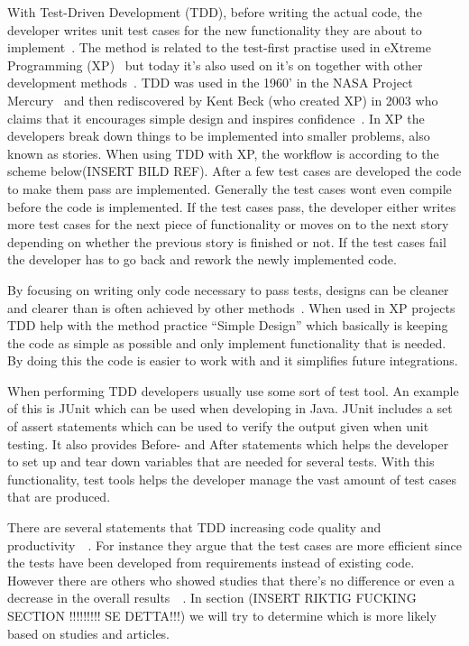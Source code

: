 With Test-Driven Development (TDD), before writing the actual code, the developer writes unit test cases for the new functionality they are about to implement~\cite{beckTestDriven}. The method is related to the test-first practise used in eXtreme Programming (XP)~\cite{beckXP} but today it’s also used on it’s on together with other development methods~\cite{MSNET}. TDD was used in the 1960’ in the NASA Project Mercury~\cite{NASA} and then rediscovered by Kent Beck (who created XP) in 2003 who claims that it encourages simple design and inspires confidence~\cite{beckXP}. In XP the developers break down things to be implemented into smaller problems, also known as stories. When using TDD with XP, the workflow is according to the scheme below(INSERT BILD REF). After a few test cases are developed the code to make them pass are implemented. Generally the test cases wont even compile before the code is implemented. If the test cases pass, the developer either writes more test cases for the next piece of functionality or moves on to the next story depending on whether the previous story is finished or not. If the test cases fail the developer has to go back and rework the newly implemented code.


By focusing on writing only code necessary to pass tests, designs can be cleaner and clearer than is often achieved by other methods~\cite{beckXP}. When used in XP projects TDD help with the method practice “Simple Design” which basically is keeping the code as simple as possible and only implement functionality that is needed. By doing this the code is easier to work with and it simplifies future integrations. 


When performing TDD developers usually use some sort of test tool. An example of this is JUnit which can be used when developing in Java. JUnit includes a set of assert statements which can be used to verify the output given when unit testing. It also provides Before- and After statements which helps the developer to set up and tear down variables that are needed for several tests. With this functionality, test tools helps the developer manage the vast amount of test cases that are produced.


There are several statements that TDD increasing code quality and productivity~\cite{beckXP}~\cite{effectiveTDD}. For instance they argue that the test cases are more efficient since the tests have been developed from requirements instead of existing code. However there are others who showed studies that there’s no difference or even a decrease in the overall results~\cite{tddInvest}~\cite{muller}. In section (INSERT RIKTIG FUCKING SECTION !!!!!!!!! SE DETTA!!!) we will try to determine which is more likely based on studies and articles.